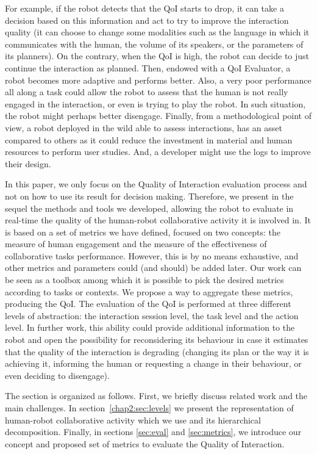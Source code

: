 \documentclass[a4paper,11pt,twoside]{StyleThese}
\begin{document}
For example, if the robot detects that the QoI starts to drop, it can take a decision based on this information and act to try to improve the interaction quality (\eg it can choose to change some modalities such as the language in which it communicates with the human, the volume of its speakers, or the parameters of its planners). On the contrary, when the QoI is high, the robot can decide to just continue the interaction as planned. Then, endowed with a QoI Evaluator, a robot becomes more adaptive and performs better. Also, a very poor performance all along a task could allow the robot to assess that the human is not really engaged in the interaction, or even is trying to play the robot. In such situation, the robot might perhaps better disengage. 
Finally, from a methodological point of view, a robot deployed in the wild able to assess interactions, has an asset compared to others as it could reduce the investment in material and human resources to perform user studies. And, a developer might use the logs to improve their design. 

In this paper, we only focus on the Quality of Interaction evaluation process and not on how to use its result for decision making. Therefore,  we present in the sequel the methods and tools we developed, allowing the robot to evaluate in real-time the quality of the human-robot collaborative activity it is involved in. It is based on a set of metrics we have defined, focused on two concepts: the measure of human engagement and the measure of the effectiveness of collaborative tasks performance. However, this is by no means exhaustive, and other metrics and parameters could (and should) be added later. Our work can be seen as a toolbox among which it is possible to pick the desired metrics according to tasks or contexts. We propose a way to aggregate these metrics, producing the QoI. The evaluation of the QoI is performed at three different levels of abstraction: the interaction session level, the task level and the action level. In further work, this ability could provide additional information to the robot and open the possibility for reconsidering its behaviour in case it estimates that the quality of the interaction is degrading (\eg changing its plan or the way it is achieving it, informing the human or requesting a change in their behaviour, or even deciding to disengage).

The section is organized as follows. First, we briefly discuss related work and the main challenges. In section~\ref{chap2:sec:levels} we present the representation of human-robot collaborative activity which we use and its hierarchical  decomposition. Finally, in sections \ref{sec:eval} and \ref{sec:metrics}, we introduce our concept and proposed set of metrics to evaluate the Quality of Interaction.
\end{document}
